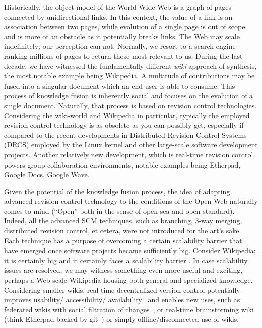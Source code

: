 \documentclass{acm_proc_article-sp}
\begin{document}
Historically, the object model of the World Wide Web is a graph
of pages connected by unidirectional links. In this context,
the value of a link is an association between two pages, while
evolution of a single page is out of scope and is more of an
obstacle as it potentially breaks links.
The Web may scale indefinitely; our perception can not. 
Normally, we resort to a search engine ranking millions of
pages to return those most relevant to us.
During the last decade, we have witnessed the fundamentally
different \emph{wiki} approach of synthesis, the most notable
example being Wikipedia. A multitude of contributions may be
fused into a singular document which an end user is able to consume.
This process of knowledge fusion is inherently social and
focuses on the evolution of a single document.
Naturally, that process is based on revision control technologies.
Considering the wiki-world and Wikipedia in particular, typically the employed revision control technology is as obsolete as you can possibly get, especially if compared to the recent developments in Distributed Revision Control Systems (DRCS) employed by the Linux kernel and other large-scale software development projects.
Another relatively new development, which is real-time revision control, powers group collaboration environments, notable examples being Etherpad, Google Docs, Google Wave.

Given the potential of the knowledge fusion process, the idea of adapting advanced revision control technology to the conditions of the Open Web naturally comes to mind (``Open'' both in the sense of open sea and open standard). 
Indeed, all the advanced SCM techniques, such as branching, 3-way merging, distributed revision control, et cetera, were not introduced for the art's sake. Each technique has a purpose of overcoming a certain scalability barrier that have emerged once software projects became sufficiently big. 
Consider Wikipedia; it is certainly big and it certainly faces a scalability barrier \cite{no-singularity, wp-decay}. In case scalability issues are resolved, we may witness something even more useful and exciting, perhaps  a Web-scale Wikipedia housing both general and specialized knowledge.
Considering smaller wikis, real-time decentralized version control potentially improves usability/ accessibility/ availability~\cite{nahaboo} and enables new uses, such as federated wikis with social filtration of changes~\cite{www06}, or real-time brainstorming wiki (think Etherpad backed by git~\cite{git}) or simply offline/disconnected use of wikis.
\end{document}
